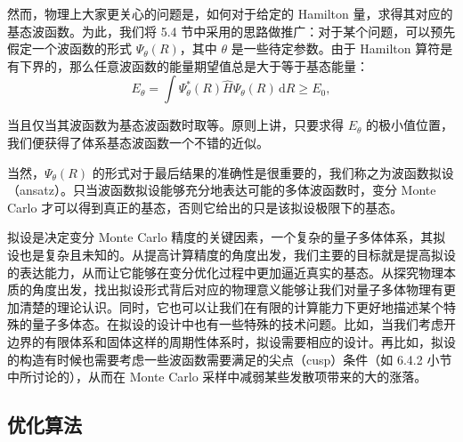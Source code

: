 然而，物理上大家更关心的问题是，如何对于给定的 Hamilton 量，求得其对应的基态波函数。为此，我们将 5.4 节中采用的思路做推广：对于某个问题，可以预先假定一个波函数的形式 $\Psi_\theta(R)$，其中 $\theta$ 是一些待定参数。由于 Hamilton 算符是有下界的，那么任意波函数的能量期望值总是大于等于基态能量：
\begin{equation}
E_\theta=\int \Psi_\theta^*(R)\hat H\Psi_\theta(R)\,\mathrm dR\ge E_0,
\tag{7.6.5}
\end{equation}

当且仅当其波函数为基态波函数时取等。原则上讲，只要求得 $E_\theta$ 的极小值位置，我们便获得了体系基态波函数一个不错的近似。

当然，$\Psi_\theta(R)$ 的形式对于最后结果的准确性是很重要的，我们称之为波函数拟设（ansatz）。只当波函数拟设能够充分地表达可能的多体波函数时，变分 Monte Carlo 才可以得到真正的基态，否则它给出的只是该拟设极限下的基态。

拟设是决定变分 Monte Carlo 精度的关键因素，一个复杂的量子多体体系，其拟设也是复杂且未知的。从提高计算精度的角度出发，我们主要的目标就是提高拟设的表达能力，从而让它能够在变分优化过程中更加逼近真实的基态。从探究物理本质的角度出发，找出拟设形式背后对应的物理意义能够让我们对量子多体物理有更加清楚的理论认识。同时，它也可以让我们在有限的计算能力下更好地描述某个特殊的量子多体态。在拟设的设计中也有一些特殊的技术问题。比如，当我们考虑开边界的有限体系和固体这样的周期性体系时，拟设需要相应的设计。再比如，拟设的构造有时候也需要考虑一些波函数需要满足的尖点（cusp）条件（如 6.4.2 小节中所讨论的），从而在 Monte Carlo 采样中减弱某些发散项带来的大的涨落。

\subsection{优化算法}

